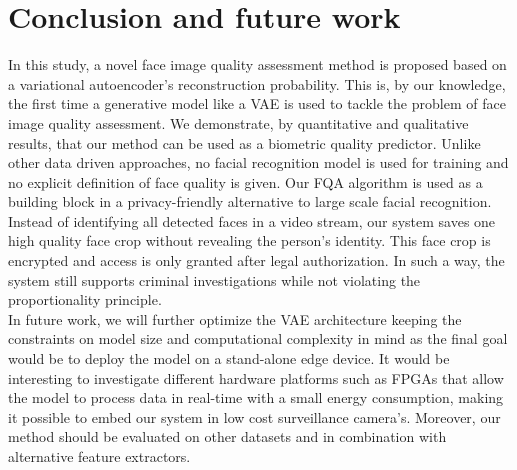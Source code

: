\documentclass[letterpaper]{article} %
\begin{document}
\section{Conclusion and future work}
\label{section:conclusion}
In this study, a novel face image quality assessment method is proposed based on a variational autoencoder's reconstruction probability. This is, by our knowledge, the first time a generative model like a VAE is used to tackle the problem of face image quality assessment. We demonstrate, by quantitative and qualitative results, that our method can be used as a biometric quality predictor. Unlike other data driven approaches, no facial recognition model is used for training and no explicit definition of face quality is given. Our FQA algorithm is used as a building block in a privacy-friendly alternative to large scale facial recognition. Instead of identifying all detected faces in a video stream, our system saves one high quality face crop without revealing the person's identity. This face crop is encrypted and access is only granted after legal authorization. In such a way, the system still supports criminal investigations while not violating the proportionality principle.
\\
\newline
In future work, we will further optimize the VAE architecture keeping the constraints on model size and computational complexity in mind as the final goal would be to deploy the model on a stand-alone edge device. It would be interesting to investigate different hardware platforms such as FPGAs that allow the model to process data in real-time with a small energy consumption, making it possible to embed our system in low cost surveillance camera's. Moreover, our method should be evaluated on other datasets and in combination with alternative feature extractors.
\end{document}

